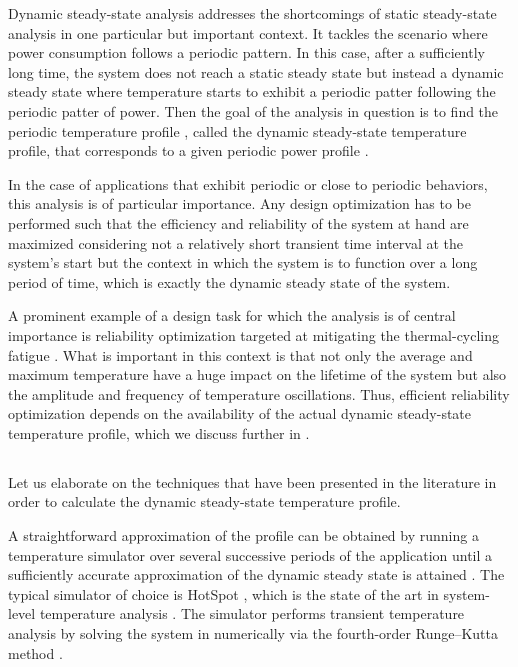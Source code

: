 Dynamic steady-state analysis addresses the shortcomings of static steady-state
analysis in one particular but important context. It tackles the scenario where
power consumption follows a periodic pattern. In this case, after a sufficiently
long time, the system does not reach a static steady state but instead a dynamic
steady state where temperature starts to exhibit a periodic patter following the
periodic patter of power. Then the goal of the analysis in question is to find
the periodic temperature profile \mq, called the dynamic steady-state
temperature profile, that corresponds to a given periodic power profile \mp.

In the case of applications that exhibit periodic or close to periodic
behaviors, this analysis is of particular importance. Any design optimization
has to be performed such that the efficiency and reliability of the system at
hand are maximized considering not a relatively short transient time interval at
the system's start but the context in which the system is to function over a
long period of time, which is exactly the dynamic steady state of the system.

A prominent example of a design task for which the analysis is of central
importance is reliability optimization targeted at mitigating the
thermal-cycling fatigue \cite{jedec2016}. What is important in this context is
that not only the average and maximum temperature have a huge impact on the
lifetime of the system but also the amplitude and frequency of temperature
oscillations. Thus, efficient reliability optimization depends on the
availability of the actual dynamic steady-state temperature profile, which we
discuss further in .

\subsection{\priortitle}

Let us elaborate on the techniques that have been presented in the literature in
order to calculate the dynamic steady-state temperature profile.

A straightforward approximation of the profile can be obtained by running a
temperature simulator over several successive periods of the application until a
sufficiently accurate approximation of the dynamic steady state is attained
\cite{srinivasan2004}. The typical simulator of choice is HotSpot
\cite{skadron2003}, which is the state of the art in system-level temperature
analysis \cite{srinivasan2004, liao2005, coskun2006, liu2007, huang2009b,
xiang2010, thiele2011}. The simulator performs transient temperature analysis by
solving the system in  numerically via the
fourth-order Runge--Kutta method \cite{press2007}.

